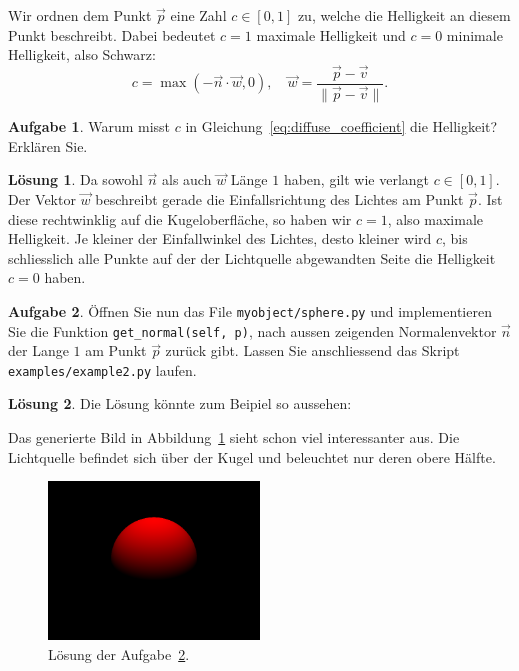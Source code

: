 \documentclass[12pt,a4paper]{article}
\theoremstyle{definition}
\newtheorem{aufgabe}{Aufgabe}
\theoremstyle{definition}
\newtheorem*{losung*}{Lösung}
\begin{document}
Wir ordnen dem Punkt $\vec{p}$ eine Zahl $c\in\left[0,1\right]$ zu, welche die Helligkeit an diesem Punkt beschreibt.
Dabei bedeutet $c=1$ maximale Helligkeit und $c=0$ minimale Helligkeit, also Schwarz:
\begin{equation}\label{eq:diffuse_coefficient}
	c=\max\left(-\vec{n}\cdot\vec{w}, 0\right),\quad
	\vec{w}=\frac{\vec{p}-\vec{v}}{\lVert\vec{p}-\vec{v}\rVert}.
\end{equation}
\begin{aufgabe}\label{aufg:diffuse_coefficient}
	Warum misst $c$ in Gleichung~\eqref{eq:diffuse_coefficient} die Helligkeit? Erklären Sie.
\end{aufgabe}
\begin{losung*}
	Da sowohl $\vec{n}$ als auch $\vec{w}$ Länge $1$ haben, gilt wie verlangt $c\in\left[0,1\right]$.
	Der Vektor $\vec{w}$ beschreibt gerade die Einfallsrichtung des Lichtes am Punkt $\vec{p}$.
	Ist diese rechtwinklig auf die Kugeloberfläche, so haben wir $c=1$, also maximale Helligkeit.
	Je kleiner der Einfallwinkel des Lichtes, desto kleiner wird $c$, bis schliesslich alle  Punkte auf der der Lichtquelle abgewandten Seite die Helligkeit $c=0$ haben.
\end{losung*}
\begin{aufgabe}\label{aufg:diffuse_implementation}
	Öffnen Sie nun das File \texttt{myobject/sphere.py} und implementieren Sie die Funktion \texttt{get\_normal(self, p)}, nach aussen zeigenden Normalenvektor $\vec{n}$ der Lange $1$ am Punkt $\vec{p}$ zurück gibt.
	Lassen Sie anschliessend das Skript \texttt{examples/example2.py} laufen.
\end{aufgabe}
\begin{losung*}
	Die Lösung könnte zum Beipiel so aussehen:
	
	Das generierte Bild in Abbildung~\ref{fig:solution_diffuse} sieht schon viel interessanter aus.
	Die Lichtquelle befindet sich über der Kugel und beleuchtet nur deren obere Hälfte.
	\begin{figure}[ht]
		\centering
		\includegraphics[width=0.5\textwidth]{images/example2.png}
		\caption{Lösung der Aufgabe~\ref{aufg:diffuse_implementation}.}
		\label{fig:solution_diffuse}
	\end{figure}
\end{losung*}
\end{document}
